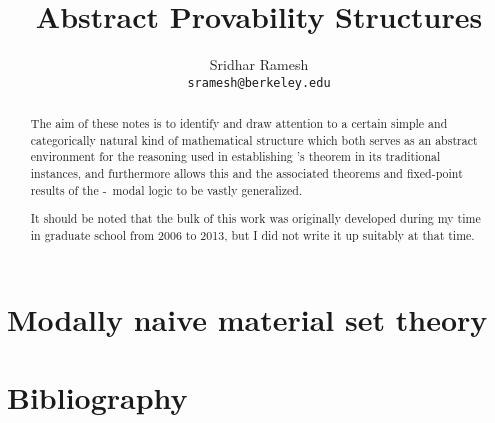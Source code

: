 \documentclass[12pt]{article}
\title{Abstract Provability Structures}
\author{
  Sridhar Ramesh\\
  \texttt{sramesh@berkeley.edu}
}
\begin{document}
\maketitle

\begin{abstract}
The aim of these notes is to identify and draw attention to a certain simple and categorically natural kind of mathematical structure which both serves as an abstract environment for the reasoning used in establishing \Loeb's theorem in its traditional instances, and furthermore allows this and the associated theorems and fixed-point results of the \Goedel-\Loeb\ modal logic to be vastly generalized.

It should be noted that the bulk of this work was originally developed during my time in graduate school from 2006 to 2013, but I did not write it up suitably at that time.
\end{abstract}

\newpage
{}
\setcounter{page}{1}
\tableofcontents

\newpage 

\newpage 

\newpage 

\newpage 

\newpage 

\newpage 

\newpage 

\newpage \section{Modally naive material set theory}
\TODO


\newpage 

\newpage \section{Bibliography}
\printbibliography

\printindex
\end{document}
